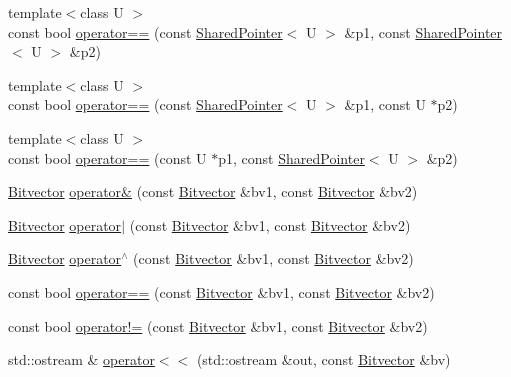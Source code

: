 \begin{DoxyCompactItemize}
\item 
{\footnotesize template$<$class U $>$ }\\const bool \hyperlink{namespaceprism_ae53d52e8a36ec7ca58ea1731cc18f1d8}{operator==} (const \hyperlink{classprism_1_1_shared_pointer}{Shared\+Pointer}$<$ U $>$ \&p1, const \hyperlink{classprism_1_1_shared_pointer}{Shared\+Pointer}$<$ U $>$ \&p2)
\item 
{\footnotesize template$<$class U $>$ }\\const bool \hyperlink{namespaceprism_a2b73e87f080646696ed6b595a3900119}{operator==} (const \hyperlink{classprism_1_1_shared_pointer}{Shared\+Pointer}$<$ U $>$ \&p1, const U $\ast$p2)
\item 
{\footnotesize template$<$class U $>$ }\\const bool \hyperlink{namespaceprism_a1f29b22985dc0ec1fc548a551ce313ed}{operator==} (const U $\ast$p1, const \hyperlink{classprism_1_1_shared_pointer}{Shared\+Pointer}$<$ U $>$ \&p2)
\item 
\hyperlink{classprism_1_1_bitvector}{Bitvector} \hyperlink{namespaceprism_a26b2b2b5b2c5f305badd964c24625b36}{operator\&} (const \hyperlink{classprism_1_1_bitvector}{Bitvector} \&bv1, const \hyperlink{classprism_1_1_bitvector}{Bitvector} \&bv2)
\item 
\hyperlink{classprism_1_1_bitvector}{Bitvector} \hyperlink{namespaceprism_a145d1e196c14cdbdc4eccb01c60c9275}{operator$\vert$} (const \hyperlink{classprism_1_1_bitvector}{Bitvector} \&bv1, const \hyperlink{classprism_1_1_bitvector}{Bitvector} \&bv2)
\item 
\hyperlink{classprism_1_1_bitvector}{Bitvector} \hyperlink{namespaceprism_a6a18ff84f30ae8056d6807056a24ef14}{operator$^\wedge$} (const \hyperlink{classprism_1_1_bitvector}{Bitvector} \&bv1, const \hyperlink{classprism_1_1_bitvector}{Bitvector} \&bv2)
\item 
const bool \hyperlink{namespaceprism_aca036c7f0f8a5aaf98b46b4879189bcc}{operator==} (const \hyperlink{classprism_1_1_bitvector}{Bitvector} \&bv1, const \hyperlink{classprism_1_1_bitvector}{Bitvector} \&bv2)
\item 
const bool \hyperlink{namespaceprism_aca663878d61686ef365f3e51efddc4b4}{operator!=} (const \hyperlink{classprism_1_1_bitvector}{Bitvector} \&bv1, const \hyperlink{classprism_1_1_bitvector}{Bitvector} \&bv2)
\item 
std\+::ostream \& \hyperlink{namespaceprism_a0b98ff0fee78022242292f24158ad1f0}{operator$<$$<$} (std\+::ostream \&out, const \hyperlink{classprism_1_1_bitvector}{Bitvector} \&bv)

\end{DoxyCompactItemize}

